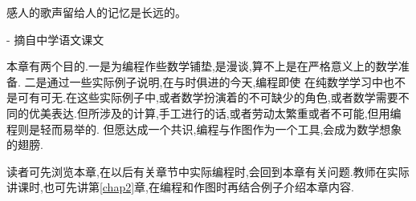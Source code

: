 \documentclass[main.tex]{subfiles}
\begin{document}
\begin{flushright}
	\begin{kaishu}
		感人的歌声留给人的记忆是长远的。\\
	\end{kaishu}
	- 摘自中学语文课文
\end{flushright}

本章有两个目的.一是为编程作些数学铺垫,是漫谈,算不上是在严格意义上的数学准备.
二是通过一些实际例子说明,在与时俱进的今天,编程即使
在纯数学学习中也不是可有可无.在这些实际例子中,或者数学扮演着的不可缺少的角色,或者数学需要不同的优美表达.但所涉及的计算,手工进行的话,或者劳动太繁重或者不可能,但用编程则是轻而易举的.
但愿达成一个共识,编程与作图作为一个工具,会成为数学想象的翅膀.

读者可先浏览本章,在以后有关章节中实际编程时,会回到本章有关问题.教师在实际讲课时,也可先讲第\ref{chap2}章,在编程和作图时再结合例子介绍本章内容.
\end{document}
